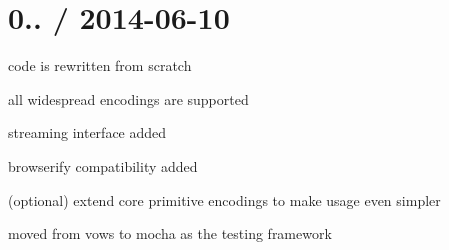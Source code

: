\section*{0.. / 2014-\/06-\/10}


\begin{DoxyItemize}
\item code is rewritten from scratch
\item all widespread encodings are supported
\item streaming interface added
\item browserify compatibility added
\item (optional) extend core primitive encodings to make usage even simpler
\item moved from vows to mocha as the testing framework 
\end{DoxyItemize}
